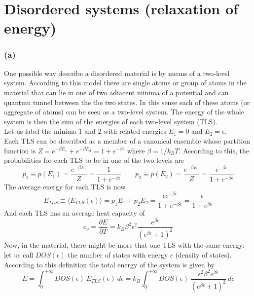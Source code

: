 \documentclass{article}
\begin{document}
\newpage

\section*{Disordered systems (relaxation of energy)}

\subsubsection*{(a)}
One possible way describe a disordered material is by means of a two-level system. According to this model there are single atoms or group of atoms in the material that can lie in one of two adiacent minima of 
a potential and can quantum tunnel between the the two states. In this sense each of these atoms (or aggregate of atoms) can be seen as a two-level system. The energy of the whole system is then the sum of the energies of each two-level system (TLS). \\
Let us label the minima $1$ and $2$ with related energies $E_1=0$ and $E_2=\epsilon$. \\
Each TLS can be described as a member of a canonical ensemble whose partition function is $Z = e^{-\beta E_1} + e^{-\beta E_2} = 1 + e^{-\beta \epsilon}$ where $\beta = 1/k_BT$. According to this, the probabilities for each TLS to be in one of the two levels are
\begin{equation*}
    p_1 \equiv p(E_1) = \frac{e^{-\beta E_1}}{Z} = \frac{1}{1 + e^{-\beta \epsilon}} \qquad p_2 \equiv p(E_2) = \frac{e^{-\beta E_1}}{Z} = \frac{e^{-\beta \epsilon}}{1 + e^{-\beta \epsilon}}
\end{equation*}
The average energy for each TLS is now
\begin{equation*}
    E_{TLS} \equiv \langle E_{TLS}(\epsilon) \rangle = p_1 E_1 + p_2 E_2 = \frac{\epsilon e^{-\beta\epsilon}}{1 + e^{-\beta\epsilon}} = \frac{\epsilon}{1 + e^{\beta\epsilon}}
\end{equation*}
And each TLS has an average heat capacity of
\begin{equation*}
    c_v = \frac{\partial E}{\partial T} = k_B \beta^2 \epsilon^2 \frac{e^{\beta \epsilon}}{(e^{\beta \epsilon} + 1)^2}
\end{equation*}
Now, in the material, there might be more that one TLS with the same energy: let us call $DOS(\epsilon)$  the number of states with energy $\epsilon$ (density of states). According to this definition the total energy of the system is given by 
\begin{equation*}
    E = \int_0^{+\infty} DOS(\epsilon) \ E_{TLS}(\epsilon) \ d\epsilon = k_B \int_0^{+\infty} DOS(\epsilon) \ \frac{\epsilon^2\beta^2 e^{\beta\epsilon}}{(e^{\beta \epsilon}+1)^2} \ d\epsilon
\end{equation*}
\end{document}
